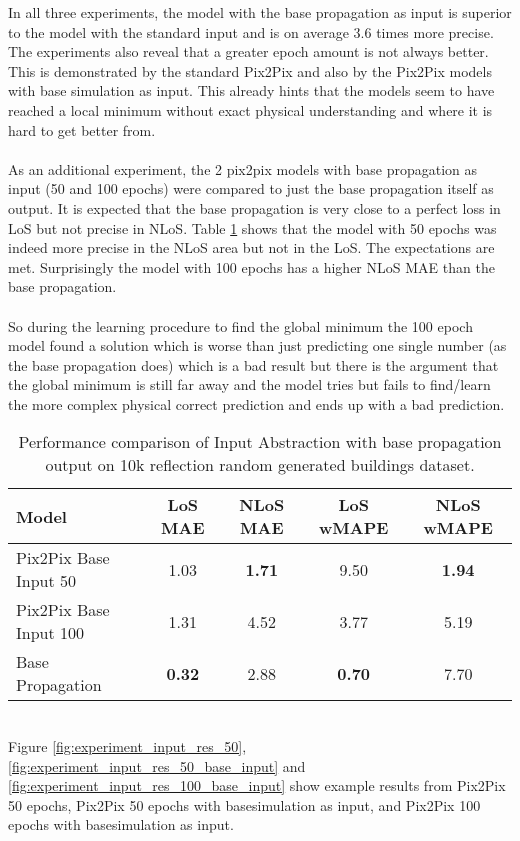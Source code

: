 		In all three experiments, the model with the base propagation as input is superior to the model with the standard input and is on average 3.6 times more precise.\\
		The experiments also reveal that a greater epoch amount is not always better. This is demonstrated by the standard Pix2Pix and also by the Pix2Pix models with base simulation as input. This already hints that the models seem to have reached a local minimum without exact physical understanding and where it is hard to get better from.\\ 
		\\
		As an additional experiment, the 2 pix2pix models with base propagation as input (50 and 100 epochs) were compared to just the base propagation itself as output. It is expected that the base propagation is very close to a perfect loss in LoS but not precise in NLoS. Table \ref{tab:performance_input_base} shows that the model with 50 epochs was indeed more precise in the NLoS area but not in the LoS. The expectations are met. Surprisingly the model with 100 epochs has a higher NLoS MAE than the base propagation.\\\\ So during the learning procedure to find the global minimum the 100 epoch model found a solution which is worse than just predicting one single number (as the base propagation does) which is a bad result but there is the argument that the global minimum is still far away and the model tries but fails to find/learn the more complex physical correct prediction and ends up with a bad prediction.
		\begin{table}[h!]
			\centering
			\begin{tabular}{|l|c|c|c|c|}
				\hline
				\textbf{Model} & \textbf{LoS MAE} & \textbf{NLoS MAE} & \textbf{LoS wMAPE} & \textbf{NLoS wMAPE} \\
				\hline
				Pix2Pix Base Input 50 & 1.03 & \textbf{1.71} & 9.50 & \textbf{1.94} \\
				Pix2Pix Base Input 100 & 1.31 & 4.52 & 3.77 & 5.19 \\
				Base Propagation & \textbf{0.32} & 2.88 & \textbf{0.70} & 7.70 \\
				\hline
			\end{tabular}
			\caption{Performance comparison of Input Abstraction with base propagation output on 10k reflection random generated buildings dataset.}
			\label{tab:performance_input_base}
		\end{table}
		\\
		Figure \ref{fig:experiment_input_res_50}, \ref{fig:experiment_input_res_50_base_input} and \ref{fig:experiment_input_res_100_base_input} show example results from Pix2Pix 50 epochs, Pix2Pix 50 epochs with basesimulation as input, and Pix2Pix 100 epochs with basesimulation as input.
		

